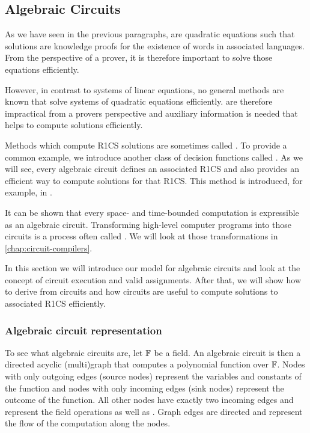 \subsection{Algebraic Circuits}
\label{sec:circuits} As we have seen in the previous paragraphs,  are quadratic equations such that solutions are knowledge proofs for the existence of words in associated languages. From the perspective of a prover, it is therefore important to solve those equations efficiently. 

However,  in contrast to systems of linear equations, no general methods are known that solve systems of quadratic equations efficiently.  are therefore impractical from a provers perspective and auxiliary information is needed that helps to compute solutions efficiently.

Methods which compute R1CS solutions are sometimes called .  To provide a common example, we introduce another class of decision functions called . As we will see, every algebraic circuit defines an associated R1CS and also provides an efficient way to compute solutions for that R1CS. This method is introduced, for example, in \cite{sasson-2013}.

It can be shown that every space- and time-bounded computation is expressible as an algebraic circuit. Transforming high-level computer programs into those circuits is a process often called . We will look at those transformations in \chaptname{} \ref{chap:circuit-compilers}.

In this section we will introduce our model for algebraic circuits and look at the concept of circuit execution and valid assignments. After that, we will show how to derive  from circuits and how circuits are useful to compute solutions to associated R1CS efficiently.
\subsubsection{Algebraic circuit representation} To see what algebraic circuits are, let $\mathbb{F}$ be a field. An algebraic circuit is then a directed acyclic (multi)graph that computes a polynomial function over $\mathbb{F}$. Nodes with only outgoing edges (source nodes) represent the variables and constants of the function and nodes with only incoming edges (sink nodes) represent the outcome of the function. All other nodes have exactly two incoming edges and represent the field operations  as well as . Graph edges are directed and represent the flow of the computation along the nodes.

